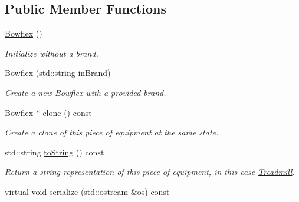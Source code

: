 \subsection*{Public Member Functions}
\begin{DoxyCompactItemize}
\item 
\hypertarget{class_bowflex_a97acf1c2c9e6a50fe29f725831b12314}{}\hyperlink{class_bowflex_a97acf1c2c9e6a50fe29f725831b12314}{Bowflex} ()\label{class_bowflex_a97acf1c2c9e6a50fe29f725831b12314}

\begin{DoxyCompactList}\small\item\em Initialize without a brand. \end{DoxyCompactList}\item 
\hyperlink{class_bowflex_a10b7274af9e6835b12ec58cb61d39eac}{Bowflex} (std\+::string in\+Brand)
\begin{DoxyCompactList}\small\item\em Create a new \hyperlink{class_bowflex}{Bowflex} with a provided brand. \end{DoxyCompactList}\item 
\hypertarget{class_bowflex_a39d1bae9773c36a0800f1dfef1de9404}{}\hyperlink{class_bowflex}{Bowflex} $\ast$ \hyperlink{class_bowflex_a39d1bae9773c36a0800f1dfef1de9404}{clone} () const \label{class_bowflex_a39d1bae9773c36a0800f1dfef1de9404}

\begin{DoxyCompactList}\small\item\em Create a clone of this piece of equipment at the same state. \end{DoxyCompactList}\item 
\hypertarget{class_bowflex_a31980655a56dcf5446d138f9beb3606b}{}std\+::string \hyperlink{class_bowflex_a31980655a56dcf5446d138f9beb3606b}{to\+String} () const \label{class_bowflex_a31980655a56dcf5446d138f9beb3606b}

\begin{DoxyCompactList}\small\item\em Return a string representation of this piece of equipment, in this case \textquotesingle{}\hyperlink{class_treadmill}{Treadmill}\textquotesingle{}. \end{DoxyCompactList}\item 
\hypertarget{class_bowflex_a5246901c7ecc848a7db8630def1755bf}{}virtual void \hyperlink{class_bowflex_a5246901c7ecc848a7db8630def1755bf}{serialize} (std\+::ostream \&os) const \label{class_bowflex_a5246901c7ecc848a7db8630def1755bf}


\end{DoxyCompactItemize}
